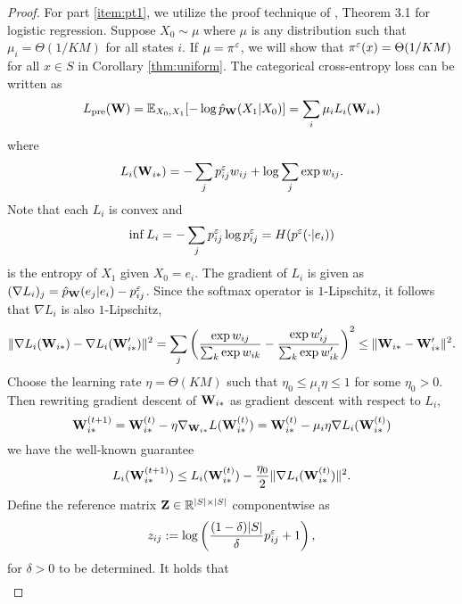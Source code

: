 \begin{proof}
For part \ref{item:pt1}, we utilize the proof technique of \citet{Ji19}, Theorem 3.1 for logistic regression. Suppose $X_0\sim\mu$ where $\mu$ is any distribution such that $\mu_i=\Theta(1/KM)$ for all states $i$. If $\mu=\pi^\varepsilon$, we will show that $\pi^\varepsilon(x)=\Theta(1/KM)$ for all $x\in S$ in Corollary \ref{thm:uniform}. The categorical cross-entropy loss can be written as
\begin{equation*}
L_{\operatorname{pre}}(\mathbf{W}) = \mathbb{E}_{X_0,X_1}[-\log\hat{p}_{\mathbf{W}}(X_1|X_0)] = \sum_i\mu_i L_i(\mathbf{W}_{i*})
\end{equation*}
where
\begin{equation*}
L_i(\mathbf{W}_{i*}) = -\sum_j p_{ij}^\varepsilon w_{ij} +\log \sum_j \exp w_{ij}.
\end{equation*}
Note that each $L_i$ is convex and
\begin{equation*}
\inf L_i = -\sum_j p_{ij}^\varepsilon\log p_{ij}^\varepsilon = H(p^\varepsilon(\cdot|e_i))
\end{equation*}
is the entropy of $X_1$ given $X_0= e_i$. The gradient of $L_i$ is given as $(\nabla L_i)_j = \hat{p}_{\mathbf{W}} (e_j|e_i) - p_{ij}^\varepsilon$. Since the softmax operator is $1$-Lipschitz, it follows that $\nabla L_i$ is also $1$-Lipschitz,
\begin{align*}
\lVert\nabla L_i(\mathbf{W}_{i*}) - \nabla L_i(\mathbf{W}_{i*}')\rVert^2 = \sum_j \left(\frac{\exp w_{ij}}{\sum_k\exp w_{ik}} - \frac{\exp w_{ij}'}{\sum_k\exp w_{ik}'}\right)^2 \le \lVert\mathbf{W}_{i*}-\mathbf{W}_{i*}'\rVert^2.
\end{align*}
Choose the learning rate $\eta=\Theta(KM)$ such that $\eta_0\le\mu_i\eta\le 1$ for some $\eta_0>0$. Then rewriting gradient descent of $\mathbf{W}_{i*}$ as gradient descent with respect to $L_i$,
\begin{equation*}
\mathbf{W}_{i*}^{(t+1)} = \mathbf{W}_{i*}^{(t)} - \eta\nabla_{\mathbf{W}_{i*}} L(\mathbf{W}_{i*}^{(t)}) = \mathbf{W}_{i*}^{(t)} - \mu_i\eta \nabla L_i(\mathbf{W}_{i*}^{(t)})
\end{equation*}
we have the well-known guarantee
\begin{equation}\label{eq:gd}
L_i(\mathbf{W}_{i*}^{(t+1)}) \le L_i(\mathbf{W}_{i*}^{(t)}) - \frac{\eta_0}{2} \lVert\nabla L_i(\mathbf{W}_{i*}^{(t)})\rVert^2.
\end{equation}
Define the reference matrix $\mathbf{Z}\in\mathbb{R}^{|S|\times|S|}$ componentwise as
\begin{equation*}
z_{ij} := \log\left(\frac{(1-\delta)|S|}{\delta}p_{ij}^\varepsilon +1\right),
\end{equation*}
for $\delta>0$ to be determined. It holds that
\begin{align*}

\end{align*}
\end{proof}
